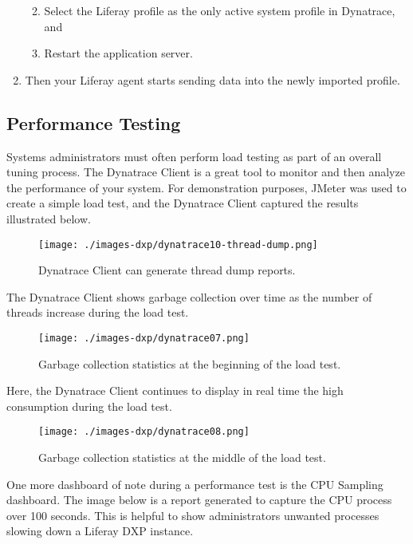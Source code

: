 \begin{enumerate}
  \begin{enumerate}
  \def\labelenumii{\alph{enumii}.}
  \tightlist
  \item
    Select the Liferay profile as the only active system profile in
    Dynatrace, and
  \item
    Restart the application server.
  \end{enumerate}
\item
  Then your Liferay agent starts sending data into the newly imported
  profile.
\end{enumerate}

\subsection{Performance Testing}\label{performance-testing}

Systems administrators must often perform load testing as part of an
overall tuning process. The Dynatrace Client is a great tool to monitor
and then analyze the performance of your system. For demonstration
purposes, JMeter was used to create a simple load test, and the
Dynatrace Client captured the results illustrated below.

\begin{figure}
\centering
\texttt{[image: ./images-dxp/dynatrace10-thread-dump.png]}
\caption{Dynatrace Client can generate thread dump reports.}
\end{figure}

The Dynatrace Client shows garbage collection over time as the number of
threads increase during the load test.

\begin{figure}
\centering
\texttt{[image: ./images-dxp/dynatrace07.png]}
\caption{Garbage collection statistics at the beginning of the load
test.}
\end{figure}

Here, the Dynatrace Client continues to display in real time the high
consumption during the load test.

\begin{figure}
\centering
\texttt{[image: ./images-dxp/dynatrace08.png]}
\caption{Garbage collection statistics at the middle of the load test.}
\end{figure}

One more dashboard of note during a performance test is the CPU Sampling
dashboard. The image below is a report generated to capture the CPU
process over 100 seconds. This is helpful to show administrators
unwanted processes slowing down a Liferay DXP instance.

